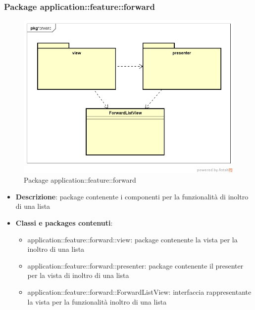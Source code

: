 \subsubsection{Package application::feature::forward}
\label{Package application::feature::forward}
\begin{figure}[H]
	\centering
	\includegraphics[scale=0.5]{Sezioni/Packages/Application/forward.png}
	\caption{Package application::feature::forward}
\end{figure}
\begin{itemize}
	\item \textbf{Descrizione}: package contenente i componenti per la funzionalità di inoltro di una lista
	\item \textbf{Classi e packages contenuti}:
	\begin{itemize}
	\item application::feature::forward::view: package contenente la vista per la inoltro di una lista
	\item application::feature::forward::presenter: package contenente il presenter per la vista di inoltro di una lista
	\item application::feature::forward::ForwardListView: interfaccia rappresentante la vista per la funzionalità inoltro di una lista
	\end{itemize}
\end{itemize}

